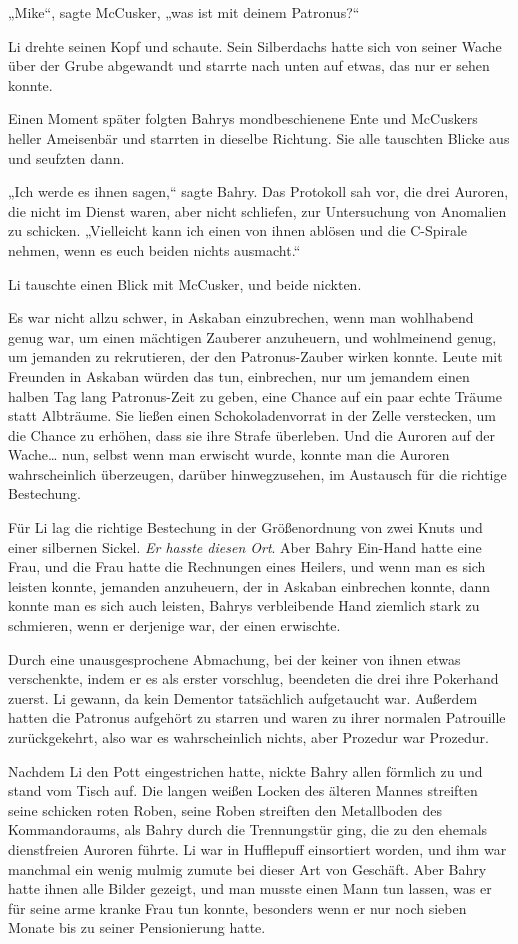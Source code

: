 {„Mike“, sagte McCusker, „was ist mit deinem Patronus?“

Li drehte seinen Kopf und schaute. Sein Silberdachs hatte sich von seiner Wache über der Grube abgewandt und starrte nach unten auf etwas, das nur er sehen konnte.

Einen Moment später folgten Bahrys mondbeschienene Ente und McCuskers heller Ameisenbär und starrten in dieselbe Richtung. Sie alle tauschten Blicke aus und seufzten dann.

„Ich werde es ihnen sagen,“ sagte Bahry. Das Protokoll sah vor, die drei Auroren, die nicht im Dienst waren, aber nicht schliefen, zur Untersuchung von Anomalien zu schicken. „Vielleicht kann ich einen von ihnen ablösen und die C-Spirale nehmen, wenn es euch beiden nichts ausmacht.“

Li tauschte einen Blick mit McCusker, und beide nickten.

Es war nicht allzu schwer, in Askaban einzubrechen, wenn man wohlhabend genug war, um einen mächtigen Zauberer anzuheuern, und wohlmeinend genug, um jemanden zu rekrutieren, der den Patronus-Zauber wirken konnte. Leute mit Freunden in Askaban würden das tun, einbrechen, nur um jemandem einen halben Tag lang Patronus-Zeit zu geben, eine Chance auf ein paar echte Träume statt Albträume. Sie ließen einen Schokoladenvorrat in der Zelle verstecken, um die Chance zu erhöhen, dass sie ihre Strafe überleben. Und die Auroren auf der Wache… nun, selbst wenn man erwischt wurde, konnte man die Auroren wahrscheinlich überzeugen, darüber hinwegzusehen, im Austausch für die richtige Bestechung.

Für Li lag die richtige Bestechung in der Größenordnung von zwei Knuts und einer silbernen Sickel. \emph{Er hasste diesen Ort}. Aber Bahry Ein-Hand hatte eine Frau, und die Frau hatte die Rechnungen eines Heilers, und wenn man es sich leisten konnte, jemanden anzuheuern, der in Askaban einbrechen konnte, dann konnte man es sich auch leisten, Bahrys verbleibende Hand ziemlich stark zu schmieren, wenn er derjenige war, der einen erwischte.

Durch eine unausgesprochene Abmachung, bei der keiner von ihnen etwas verschenkte, indem er es als erster vorschlug, beendeten die drei ihre Pokerhand zuerst. Li gewann, da kein Dementor tatsächlich aufgetaucht war. Außerdem hatten die Patronus aufgehört zu starren und waren zu ihrer normalen Patrouille zurückgekehrt, also war es wahrscheinlich nichts, aber Prozedur war Prozedur.

Nachdem Li den Pott eingestrichen hatte, nickte Bahry allen förmlich zu und stand vom Tisch auf. Die langen weißen Locken des älteren Mannes streiften seine schicken roten Roben, seine Roben streiften den Metallboden des Kommandoraums, als Bahry durch die Trennungstür ging, die zu den ehemals dienstfreien Auroren führte. Li war in Hufflepuff einsortiert worden, und ihm war manchmal ein wenig mulmig zumute bei dieser Art von Geschäft. Aber Bahry hatte ihnen alle Bilder gezeigt, und man musste einen Mann tun lassen, was er für seine arme kranke Frau tun konnte, besonders wenn er nur noch sieben Monate bis zu seiner Pensionierung hatte.

}
